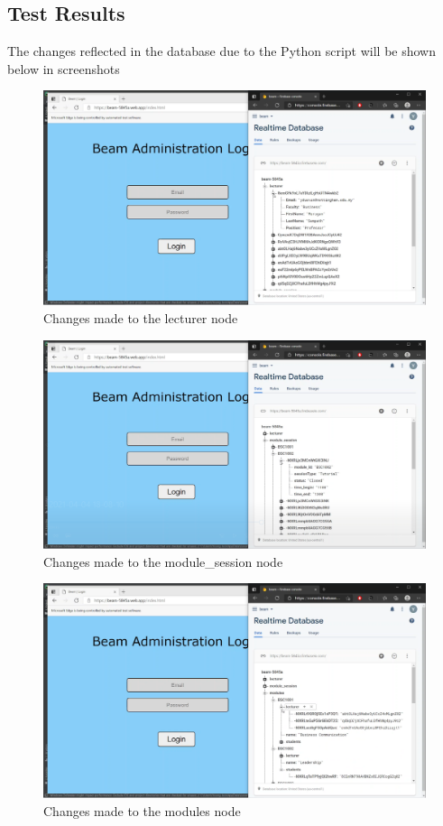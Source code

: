 \documentclass[../report.tex]{subfiles}
\begin{document}
\subsection{Test Results}
The changes reflected in the database due to the Python script will be shown below in screenshots
\begin{figure}[H]
	\centering
	\includegraphics[width=.7\linewidth]{../images/07/01-07-test-lecturer.png}
	\caption{Changes made to the lecturer node}
	\label{fig:07-01-07-test-lecturer}
\end{figure}
\begin{figure}[H]
	\centering
	\includegraphics[width=.7\linewidth]{../images/07/01-08-test-module-session.png}
	\caption{Changes made to the module\_session node}
	\label{fig:07-01-08-test-module-session}
\end{figure}
\begin{figure}[H]
	\centering
	\includegraphics[width=.7\linewidth]{../images/07/01-09-test-module.png}
	\caption{Changes made to the modules node}
	\label{fig:07-01-09-test-module}
\end{figure}
\end{document}
